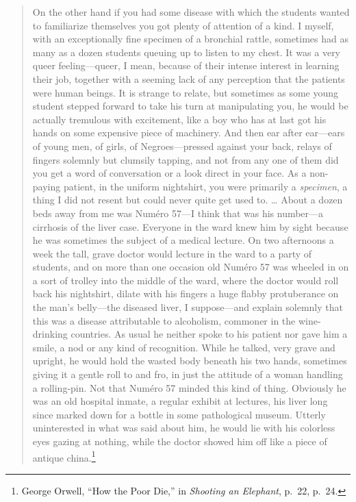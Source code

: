 \documentclass[openany,nobib]{tufte-book}
\begin{document}
\begin{quote}
On the other hand if you had some disease with which the students wanted
to familiarize themselves you got plenty of attention of a kind. I
myself, with an exceptionally fine specimen of a bronchial rattle,
sometimes had as many as a dozen students queuing up to listen to my
chest. It was a very queer feeling---queer, I mean, because of their
intense interest in learning their job, together with a seeming lack of
any perception that the patients were human beings. It is strange to
relate, but sometimes as some young student stepped forward to take his
turn at manipulating you, he would be actually tremulous with
excitement, like a boy who has at last got his hands on some expensive
piece of machinery. And then ear after ear---ears of young men, of
girls, of Negroes---pressed against your back, relays of fingers
solemnly but clumsily tapping, and not from any one of them did you get
a word of conversation or a look direct in your face. As a non-paying
patient, in the uniform nightshirt, you were primarily a
\emph{specimen}, a thing I did not resent but could never quite get used
to. \ldots{} About a dozen beds away from me was Numéro 57---I think
that was his number---a cirrhosis of the liver case. Everyone in the
ward knew him by sight because he was sometimes the subject of a medical
lecture. On two afternoons a week the tall, grave doctor would lecture
in the ward to a party of students, and on more than one occasion old
Numéro 57 was wheeled in on a sort of trolley into the middle of the
ward, where the doctor would roll back his nightshirt, dilate with his
fingers a huge flabby protuberance on the man's belly---the diseased
liver, I suppose---and explain solemnly that this was a disease
attributable to alcoholism, commoner in the wine-drinking countries. As
usual he neither spoke to his patient nor gave him a smile, a nod or any
kind of recognition. While he talked, very grave and upright, he would
hold the wasted body beneath his two hands, sometimes giving it a gentle
roll to and fro, in just the attitude of a woman handling a rolling-pin.
Not that Numéro 57 minded this kind of thing. Obviously he was an old
hospital inmate, a regular exhibit at lectures, his liver long since
marked down for a bottle in some pathological museum. Utterly
uninterested in what was said about him, he would lie with his colorless
eyes gazing at nothing, while the doctor showed him off like a piece of
antique china.\footnote{George Orwell, ``How the Poor Die,'' in
  \emph{Shooting an Elephant}, p.~22, p.~24.}
\end{quote}
\end{document}
